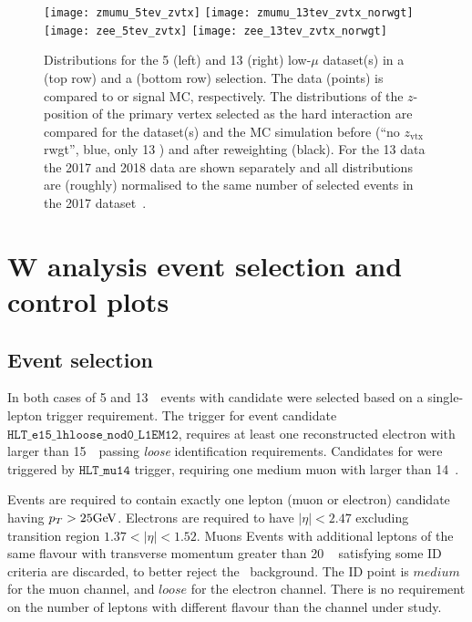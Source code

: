 \begin{figure}[tph]
	\centering
	\texttt{[image: zmumu\_5tev\_zvtx]}%
	\texttt{[image: zmumu\_13tev\_zvtx\_norwgt]}
	\texttt{[image: zee\_5tev\_zvtx]}%
	\texttt{[image: zee\_13tev\_zvtx\_norwgt]}
	\caption{Distributions for the 5 \TeV{} (left) and 13 \TeV{} (right)
		low-$\mu$ dataset(s) in a \Zgmm (top row) and a \Zgee (bottom row)
		selection. The data (points) is compared to \Zgmm or \Zgee signal
		MC, respectively. The distributions of the $z$-position of the
		primary vertex selected as the hard interaction are compared for
		the dataset(s) and the MC simulation before (``no $z_\mathrm{vtx}$
		rwgt'', blue, only 13 \TeV{}) and after reweighting (black). For
		the 13 \TeV{} data the 2017 and 2018 data are shown separately and
		all distributions are (roughly) normalised to the same number of
		selected events in the 2017 dataset~\cite{int_note_samples}.}
	\label{fig:zvtx}
\end{figure}
\section{W analysis event selection and control plots}
\label{sec:selection}

\subsection{Event selection}
\label{subsec:wselection}
In both cases of 5 and 13~\TeV\, events with \Wln{} candidate were selected based on a single-lepton trigger requirement.
The trigger for \Wen event candidate $\texttt{HLT\_e15\_lhloose\_nod0\_L1EM12}$, requires at least one reconstructed electron with \ET larger than 15~\GeV\ passing \emph{loose} identification requirements. Candidates for \Wmn were triggered by $\texttt{HLT\_mu14}$ trigger, requiring one medium muon with \ET larger than 14~\GeV.

Events are required to contain exactly one lepton (muon or electron) candidate having $p_T > 25\text{Ge\kern -0.1em V}$. Electrons are required to have $|\eta|<2.47$ excluding transition region $1.37 < |\eta|< 1.52$. Muons   
Events with additional leptons of the same flavour with transverse momentum greater than 20 ~\GeV{} satisfying some ID criteria are discarded, to better reject the \Zboson\ background. The ID point is $medium$ for the muon channel, and $loose$ for the electron channel. There is no requirement on the number of leptons with different flavour than the channel under study.

